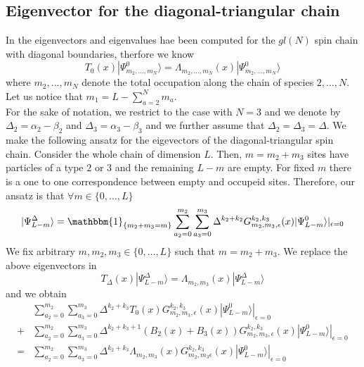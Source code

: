\documentclass[11pt]{article}
\numberwithin{equation}{section}
\numberwithin{equation}{subsection}
\begin{document}
\subsection{Eigenvector for the diagonal-triangular chain}
In \cite{belliard2011nested}  the eigenvectors and eigenvalues hae been computed for the $gl(N)$ spin chain with diagonal boundaries, therfore we know 
\begin{equation}
T_{0}(x)|\Psi_{m_{2},\ldots,m_{N}}^{0}\rangle =\Lambda_{m_{2},\ldots,m_{N}}(x)|\Psi_{m_{2},\ldots,m_{N}}^{0}\rangle
\end{equation}
where $m_{2},\ldots,m_{N}$ denote the total occupation along the chain of species $2,\ldots,N$. Let us notice that $m_{1}=L-\sum_{a=2}^{N}m_{a}$.\\
For the sake of notation, we restrict to the case with $N=3$ and we denote by $\Delta_{2}=\alpha_{2}-\beta_{2}$ and $\Delta_{3}=\alpha_{3}-\beta_{3}$ and we further assume that $\Delta_{2}=\Delta_{3}=\Delta$. 
We make the following ansatz for the eigevectors of the diagonal-triangular spin chain. Consider the whole chain of dimension $L$. Then, $m=m_{2}+m_{3}$ sites have particles of a type $2$ or $3$ and the remaining $L-m$ are empty. For fixed $m$ there is a one to one correspondence between empty and occupeid sites. Therefore, our ansatz is that $\forall m\in \{0,\ldots,L\}$ 
\begin{equation}\label{ansatzEigenvectorDelta}
|\Psi_{L-m}^{\Delta}\rangle=\mathbbm{1}_{\{m_{2}+m_{3}=m\}}\sum_{a_{2}=0}^{m_{2}}\sum_{a_{3}=0}^{m_{3}}\Delta^{k_{2}+k_{2}}G_{m_{2},m_{3},\epsilon}^{k_{2},k_{3}}(x)|\Psi_{L-m}^{0}\rangle|_{\epsilon=0}
\end{equation}
We fix arbitrary $m,m_{2},m_{3}\in \{0,\ldots,L\}$ such that $m=m_{2}+m_{3}$.  We replace the above eigenvectors in 
\begin{equation}\label{eigDELTA}
T_{\Delta}(x)|\Psi_{L-m}^{\Delta}\rangle=\Lambda_{m_{2},m_{3}}(x)|\Psi_{L-m}^{\Delta}\rangle
\end{equation}
and we obtain
\begin{align*}
&\sum_{a_{2}=0}^{m_{2}}\sum_{a_{3}=0}^{m_{3}}\Delta^{k_{2}+k_{3}}T_{0}(x)G_{m_{2},m_{3},\epsilon}^{k_{2},k_{3}}(x)|\Psi_{L-m}^{0}\rangle|_{\epsilon=0}
\\+&
\sum_{a_{2}=0}^{m_{2}}\sum_{a_{3}=0}^{m_{3}}\Delta^{k_{2}+k_{3}+1}\left(B_{2}(x)+B_{3}(x)\right)G_{m_{2},m_{3},\epsilon}^{k_{2},k_{3}}(x)|\Psi_{L-m}^{0}\rangle|_{\epsilon=0}
\\=&
\sum_{a_{2}=0}^{m_{2}}\sum_{a_{3}=0}^{m_{3}}\Delta^{k_{2}+k_{3}}\Lambda_{m_{2},m_{3}}(x)G_{m_{2},m_{3}\epsilon}^{k_{2},k_{3}}(x)|\Psi_{L-m}^{0}\rangle|_{\epsilon=0}
\end{align*}
\end{document}
